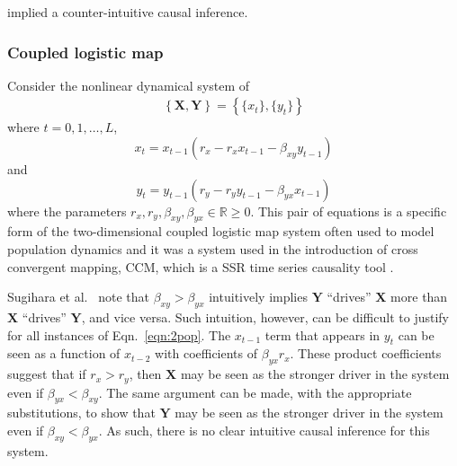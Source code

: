 \documentclass{article}[10pt]
\begin{document}
implied a counter-intuitive causal inference.

\subsubsection{Coupled logistic map}
\label{sec:2Pop}
Consider the nonlinear dynamical system of
\begin{eqnarray}
\label{eqn:2pop}
\left\{\mathbf{X},\mathbf{Y}\right\} = \left\{\{x_t\},\{y_t\}\right\}
\end{eqnarray}
where $t=0,1,\ldots,L$,
\begin{equation*}
x_t = x_{t-1}\left(r_x-r_x x_{t-1}-\beta_{xy} y_{t-1}\right)
\end{equation*}
and
\begin{equation*}
y_t = y_{t-1}\left(r_y-r_y y_{t-1}-\beta_{yx} x_{t-1}\right)
\end{equation*}
where the parameters $r_x,r_y,\beta_{xy},\beta_{yx}\in\mathbb{R}\ge 0$.  This pair of equations is a specific form of the two-dimensional coupled logistic map system often used to model population dynamics \cite{Lloyd1995} and it was a system used in the introduction of cross convergent mapping, CCM, which is a SSR time series causality tool \cite{Sugihara2012}.

Sugihara et al.\ \cite{Sugihara2012} note that $\beta_{xy}>\beta_{yx}$ intuitively implies $\mathbf{Y}$ ``drives'' $\mathbf{X}$ more than $\mathbf{X}$ ``drives'' $\mathbf{Y}$, and vice versa.  Such intuition, however, can be difficult to justify for all instances of Eqn.\ \ref{eqn:2pop}.  The $x_{t-1}$ term that appears in $y_t$ can be seen as a function of $x_{t-2}$ with coefficients of $\beta_{yx}r_x$.  These product coefficients suggest that if $r_x>r_y$, then $\mathbf{X}$ may be seen as the stronger driver in the system even if $\beta_{yx}<\beta_{xy}$.  The same argument can be made, with the appropriate substitutions, to show that $\mathbf{Y}$ may be seen as the stronger driver in the system even if $\beta_{xy}<\beta_{yx}$.  As such, there is no clear intuitive causal inference for this system. 
\end{document}
